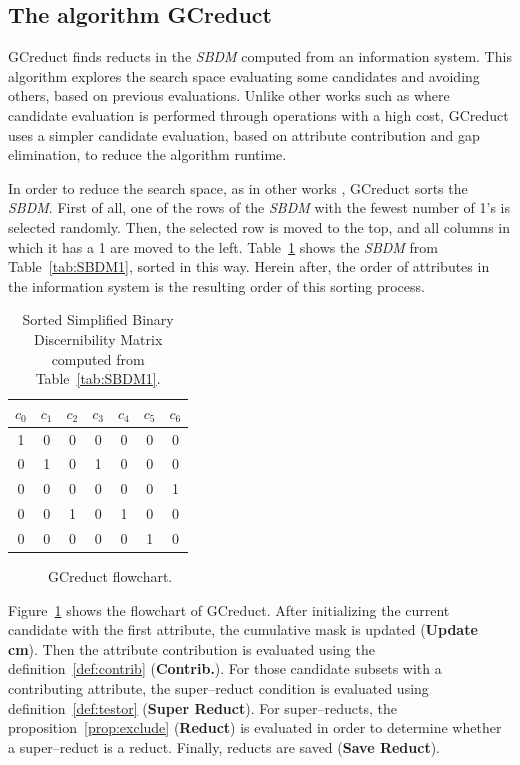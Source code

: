 \documentclass[authoryear,preprint,review,12pt]{elsarticle}
\begin{document}
\subsection{The algorithm GCreduct}\label{description}
	GCreduct finds reducts in the \textit{SBDM} computed from an information system. This algorithm explores the search space evaluating some candidates and avoiding others, based on previous evaluations. Unlike other works such as \citep{WangP07,Lias13} where candidate evaluation is performed through operations with a high cost, GCreduct uses a simpler candidate evaluation, based on attribute contribution and gap elimination, to reduce the algorithm runtime. 

	In order to reduce the search space, as in other works \citep{Sanchez07,Lias13}, GCreduct sorts the \textit{SBDM}. First of all, one of the rows of the \textit{SBDM} with the fewest number of 1's is selected randomly. Then, the selected row is moved to the top, and all columns in which it has a 1 are moved to the left. Table~\ref{tab:SSBDM1} shows the \textit{SBDM} from Table~\ref{tab:SBDM1}, sorted in this way. Herein after, the order of attributes in the information system is the resulting order of this sorting process.
		
	\begin{table}[htb]
		\caption{Sorted Simplified Binary Discernibility Matrix computed from Table~\ref{tab:SBDM1}.}
		\centering
		\begin{tabular}{ccccccc}\label{tab:SSBDM1}
			$c_0$ & $c_1$ & $c_2$ & $c_3$ & $c_4$ & $c_5$ & $c_6$\\
			\hline
			1&0&0&0&0&0&0\\
			0&1&0&1&0&0&0\\
			0&0&0&0&0&0&1\\
			0&0&1&0&1&0&0\\
			0&0&0&0&0&1&0\\
		\end{tabular}             
	\end{table}  
	
	\begin{figure}[htb]
		\begin{center}
		\end{center}
		\caption{GCreduct flowchart.}
		\label{fig:flowchart}
	\end{figure}
	
	Figure~\ref{fig:flowchart} shows the flowchart of GCreduct. After initializing the current candidate with the first attribute, the cumulative mask is updated (\textbf{Update cm}). Then the attribute contribution is evaluated using the definition~\ref{def:contrib} (\textbf{Contrib.}). For those candidate subsets with a contributing attribute, the super--reduct condition is evaluated using definition~\ref{def:testor} (\textbf{Super Reduct}). For super--reducts, the proposition~\ref{prop:exclude} (\textbf{Reduct}) is evaluated in order to determine whether a super--reduct is a reduct. Finally, reducts are saved (\textbf{Save Reduct}). %
	
\end{document}
